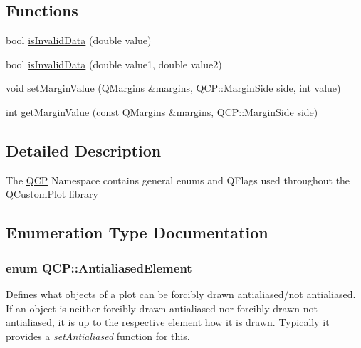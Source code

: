 \subsection*{Functions}
\begin{DoxyCompactItemize}
\item 
bool \hyperlink{namespace_q_c_p_a07ab701c05329089f933b9cae2638a63}{is\+Invalid\+Data} (double value)
\item 
bool \hyperlink{namespace_q_c_p_a728903e5c3dd17847bee280f4005496f}{is\+Invalid\+Data} (double value1, double value2)
\item 
void \hyperlink{namespace_q_c_p_afbf6e3084c108f2bb4372107945ee82f}{set\+Margin\+Value} (Q\+Margins \&margins, \hyperlink{namespace_q_c_p_a7e487e3e2ccb62ab7771065bab7cae54}{Q\+C\+P\+::\+Margin\+Side} side, int value)
\item 
int \hyperlink{namespace_q_c_p_a23a2679d3495c444acc26acc61e35b5b}{get\+Margin\+Value} (const Q\+Margins \&margins, \hyperlink{namespace_q_c_p_a7e487e3e2ccb62ab7771065bab7cae54}{Q\+C\+P\+::\+Margin\+Side} side)
\end{DoxyCompactItemize}


\subsection{Detailed Description}
The \hyperlink{namespace_q_c_p}{Q\+C\+P} Namespace contains general enums and Q\+Flags used throughout the \hyperlink{class_q_custom_plot}{Q\+Custom\+Plot} library 

\subsection{Enumeration Type Documentation}
\hypertarget{namespace_q_c_p_ae55dbe315d41fe80f29ba88100843a0c}{}
\subsubsection[{Antialiased\+Element}]{\setlength{\rightskip}{0pt plus 5cm}enum {\bf Q\+C\+P\+::\+Antialiased\+Element}}\label{namespace_q_c_p_ae55dbe315d41fe80f29ba88100843a0c}
Defines what objects of a plot can be forcibly drawn antialiased/not antialiased. If an object is neither forcibly drawn antialiased nor forcibly drawn not antialiased, it is up to the respective element how it is drawn. Typically it provides a {\itshape set\+Antialiased} function for this.

